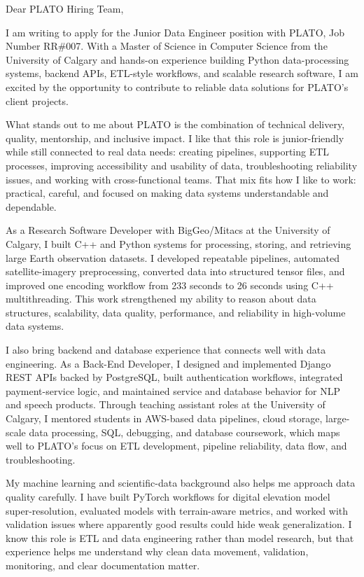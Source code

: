 \documentclass[11pt]{letter}
\begin{document}
\begin{letter}{}

\opening{Dear PLATO Hiring Team,}

I am writing to apply for the Junior Data Engineer position with PLATO, Job Number RR\#007. With a Master of Science in Computer Science from the University of Calgary and hands-on experience building Python data-processing systems, backend APIs, ETL-style workflows, and scalable research software, I am excited by the opportunity to contribute to reliable data solutions for PLATO's client projects.

What stands out to me about PLATO is the combination of technical delivery, quality, mentorship, and inclusive impact. I like that this role is junior-friendly while still connected to real data needs: creating pipelines, supporting ETL processes, improving accessibility and usability of data, troubleshooting reliability issues, and working with cross-functional teams. That mix fits how I like to work: practical, careful, and focused on making data systems understandable and dependable.

As a Research Software Developer with BigGeo/Mitacs at the University of Calgary, I built C++ and Python systems for processing, storing, and retrieving large Earth observation datasets. I developed repeatable pipelines, automated satellite-imagery preprocessing, converted data into structured tensor files, and improved one encoding workflow from 233 seconds to 26 seconds using C++ multithreading. This work strengthened my ability to reason about data structures, scalability, data quality, performance, and reliability in high-volume data systems.

I also bring backend and database experience that connects well with data engineering. As a Back-End Developer, I designed and implemented Django REST APIs backed by PostgreSQL, built authentication workflows, integrated payment-service logic, and maintained service and database behavior for NLP and speech products. Through teaching assistant roles at the University of Calgary, I mentored students in AWS-based data pipelines, cloud storage, large-scale data processing, SQL, debugging, and database coursework, which maps well to PLATO's focus on ETL development, pipeline reliability, data flow, and troubleshooting.

My machine learning and scientific-data background also helps me approach data quality carefully. I have built PyTorch workflows for digital elevation model super-resolution, evaluated models with terrain-aware metrics, and worked with validation issues where apparently good results could hide weak generalization. I know this role is ETL and data engineering rather than model research, but that experience helps me understand why clean data movement, validation, monitoring, and clear documentation matter.


\end{letter}
\end{document}
